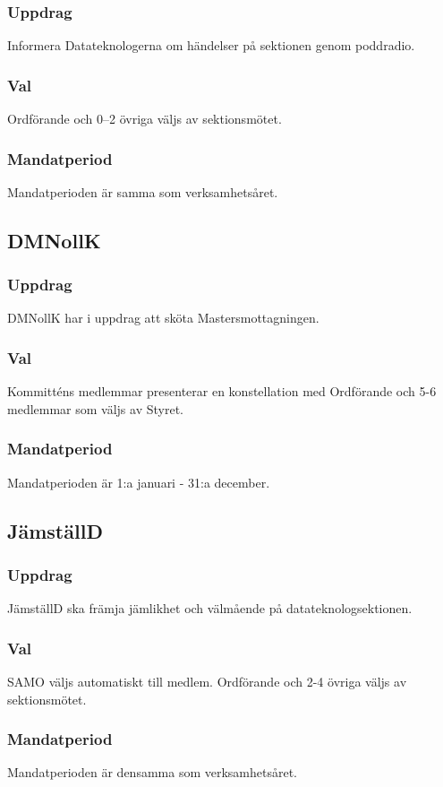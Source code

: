 \subsubsection{Uppdrag}
Informera Datateknologerna om händelser på sektionen genom poddradio.
\subsubsection{Val}
Ordförande och 0–2 övriga väljs av sektionsmötet.
\subsubsection{Mandatperiod}
Mandatperioden är samma som verksamhetsåret.

\subsection{DMNollK}
\subsubsection{Uppdrag}
DMNollK har i uppdrag att sköta Mastersmottagningen.
\subsubsection{Val}
Kommitténs medlemmar presenterar en konstellation med Ordförande och 5-6 medlemmar som väljs av Styret.
\subsubsection{Mandatperiod}
Mandatperioden är 1:a januari - 31:a december.

\subsection{JämställD}
\subsubsection{Uppdrag}
JämställD ska främja jämlikhet och välmående på datateknologsektionen.
\subsubsection{Val}
SAMO väljs automatiskt till medlem. Ordförande och 2-4 övriga väljs av sektionsmötet.
\subsubsection{Mandatperiod}
Mandatperioden är densamma som verksamhetsåret.

